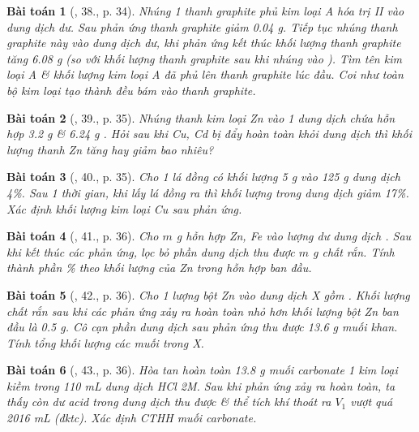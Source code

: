 \documentclass{article}
\newtheorem{baitoan}{Bài toán}
\begin{document}
\begin{baitoan}[\cite{An_350_BT_Hoa_Hoc_9}, 38., p. 34]
	Nhúng 1 thanh graphite phủ kim loại A hóa trị II vào dung dịch \emph{} dư. Sau phản ứng thanh graphite giảm \emph{0.04 g}. Tiếp tục nhúng thanh graphite này vào dung dịch \emph{} dư, khi phản ứng kết thúc khối lượng thanh graphite tăng \emph{6.08 g} (so với khối lượng thanh graphite sau khi nhúng vào \emph{}). Tìm tên kim loại A \& khối lượng kim loại A đã phủ lên thanh graphite lúc đầu. Coi như toàn bộ kim loại tạo thành đều bám vào thanh graphite.
\end{baitoan}

\begin{baitoan}[\cite{An_350_BT_Hoa_Hoc_9}, 39., p. 35]
	Nhúng thanh kim loại \emph{Zn} vào 1 dung dịch chứa hỗn hợp \emph{3.2 g } \& \emph{6.24 g }. Hỏi sau khi \emph{Cu, Cd} bị đẩy hoàn toàn khỏi dung dịch thì khối lượng thanh \emph{Zn} tăng hay giảm bao nhiêu?	
\end{baitoan}

\begin{baitoan}[\cite{An_350_BT_Hoa_Hoc_9}, 40., p. 35]
	Cho 1 lá đồng có khối lượng \emph{5 g} vào \emph{125 g} dung dịch \emph{ 4\%}. Sau 1 thời gian, khi lấy lá đồng ra thì khối lượng \emph{} trong dung dịch giảm \emph{17\%}. Xác định khối lượng kim loại \emph{Cu} sau phản ứng.
\end{baitoan}

\begin{baitoan}[\cite{An_350_BT_Hoa_Hoc_9}, 41., p. 36]
	Cho $m$ \emph{g} hỗn hợp \emph{Zn, Fe} vào lượng dư dung dịch \emph{}. Sau khi kết thúc các phản ứng, lọc bỏ phần dung dịch thu được $m$ \emph{g} chất rắn. Tính thành phần \% theo khối lượng của \emph{Zn} trong hỗn hợp ban đầu.
\end{baitoan}

\begin{baitoan}[\cite{An_350_BT_Hoa_Hoc_9}, 42., p. 36]
	Cho 1 lượng bột \emph{Zn} vào dung dịch X gồm \emph{}. Khối lượng chất rắn sau khi các phản ứng xảy ra hoàn toàn nhỏ hơn khối lượng bột \emph{Zn} ban đầu là \emph{0.5 g}. Cô cạn phần dung dịch sau phản ứng thu được \emph{13.6 g} muối khan. Tính tổng khối lượng các muối trong X.
\end{baitoan}

\begin{baitoan}[\cite{An_350_BT_Hoa_Hoc_9}, 43., p. 36]
	Hòa tan hoàn toàn \emph{13.8 g} muối carbonate 1 kim loại kiềm \emph{} trong \emph{110 mL} dung dịch \emph{HCl 2M}. Sau khi phản ứng xảy ra hoàn toàn, ta thấy còn dư acid trong dung dịch thu được \& thể tích khí thoát ra $V_1$ vượt quá \emph{2016 mL} (đktc). Xác định CTHH muối carbonate.
\end{baitoan}
\end{document}

